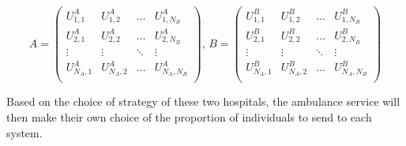 \begin{equation} \label{eq:payoff_matrices}
    A = 
    \begin{pmatrix}
        U_{1,1}^A & U_{1,2}^A & \dots & U_{1,N_B}^A \\
        U_{2,1}^A & U_{2,2}^A & \dots & U_{2,N_B}^A \\
        \vdots & \vdots & \ddots & \vdots \\
        U_{N_A,1}^A & U_{N_A,2}^A & \dots & U_{N_A,N_B}^A \\
    \end{pmatrix}, \,
    B = 
    \begin{pmatrix}
        U_{1,1}^B & U_{1,2}^B & \dots & U_{1,N_B}^B \\
        U_{2,1}^B & U_{2,2}^B & \dots & U_{2,N_B}^B \\
        \vdots & \vdots & \ddots & \vdots \\
        U_{N_A,1}^B & U_{N_A,2}^B & \dots & U_{N_A,N_B}^B \\
    \end{pmatrix}
\end{equation}

Based on the choice of strategy of these two hospitals, the ambulance service 
will then 
make their own choice of the proportion of individuals to send to each system.

